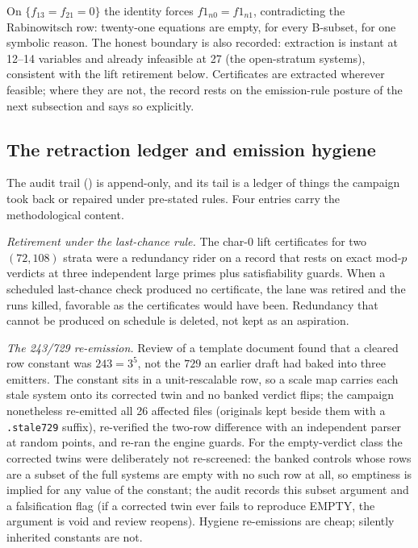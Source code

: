 \documentclass[11pt]{article}
\theoremstyle{definition}
\theoremstyle{remark}
\begin{document}
\noindent On $\{f_{13}=f_{21}=0\}$ the identity forces $f1_{n0}=f1_{n1}$, contradicting the Rabinowitsch row: twenty-one equations are empty, for every B-subset, for one symbolic reason. The honest boundary is also recorded: extraction is instant at 12--14 variables and already infeasible at 27 (the open-stratum systems), consistent with the lift retirement below. Certificates are extracted wherever feasible; where they are not, the record rests on the emission-rule posture of the next subsection and says so explicitly.

\subsection{The retraction ledger and emission hygiene}\label{sec:ledger}

The audit trail () is append-only, and its tail is a ledger of things the campaign took back or repaired under pre-stated rules. Four entries carry the methodological content.

\emph{Retirement under the last-chance rule.} The char-$0$ lift certificates for two $(72,108)$ strata were a redundancy rider on a record that rests on exact mod-$p$ verdicts at three independent large primes plus satisfiability guards. When a scheduled last-chance check produced no certificate, the lane was retired and the runs killed, favorable as the certificates would have been. Redundancy that cannot be produced on schedule is deleted, not kept as an aspiration.

\emph{The 243/729 re-emission.} Review of a template document found that a cleared row constant was $243=3^5$, not the $729$ an earlier draft had baked into three emitters. The constant sits in a unit-rescalable row, so a scale map carries each stale system onto its corrected twin and no banked verdict flips; the campaign nonetheless re-emitted all 26 affected files (originals kept beside them with a \texttt{.stale729} suffix), re-verified the two-row difference with an independent parser at random points, and re-ran the engine guards. For the empty-verdict class the corrected twins were deliberately not re-screened: the banked controls whose rows are a subset of the full systems are empty with no such row at all, so emptiness is implied for any value of the constant; the audit records this subset argument and a falsification flag (if a corrected twin ever fails to reproduce EMPTY, the argument is void and review reopens). Hygiene re-emissions are cheap; silently inherited constants are not.
\end{document}
